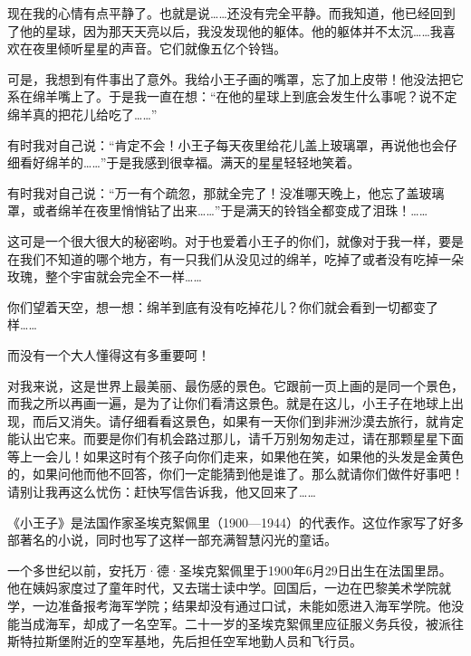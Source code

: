 现在我的心情有点平静了。也就是说\ldots{}\ldots{}还没有完全平静。而我知道，他已经回到了他的星球，因为那天天亮以后，我没发现他的躯体。他的躯体并不太沉\ldots{}\ldots{}我喜欢在夜里倾听星星的声音。它们就像五亿个铃铛。

可是，我想到有件事出了意外。我给小王子画的嘴罩，忘了加上皮带！他没法把它系在绵羊嘴上了。于是我一直在想：“在他的星球上到底会发生什么事呢？说不定绵羊真的把花儿给吃了\ldots{}\ldots{}”

有时我对自己说：“肯定不会！小王子每天夜里给花儿盖上玻璃罩，再说他也会仔细看好绵羊的\ldots{}\ldots{}”于是我感到很幸福。满天的星星轻轻地笑着。

有时我对自己说：“万一有个疏忽，那就全完了！没准哪天晚上，他忘了盖玻璃罩，或者绵羊在夜里悄悄钻了出来\ldots{}\ldots{}”于是满天的铃铛全都变成了泪珠！\ldots{}\ldots{}

这可是一个很大很大的秘密哟。对于也爱着小王子的你们，就像对于我一样，要是在我们不知道的哪个地方，有一只我们从没见过的绵羊，吃掉了或者没有吃掉一朵玫瑰，整个宇宙就会完全不一样\ldots{}\ldots{}

你们望着天空，想一想：绵羊到底有没有吃掉花儿？你们就会看到一切都变了样\ldots{}\ldots{}

而没有一个大人懂得这有多重要呵！

{\startalignment[center]
 \stopalignment}

对我来说，这是世界上最美丽、最伤感的景色。它跟前一页上画的是同一个景色，而我之所以再画一遍，是为了让你们看清这景色。就是在这儿，小王子在地球上出现，而后又消失。请仔细看看这景色，如果有一天你们到非洲沙漠去旅行，就肯定能认出它来。而要是你们有机会路过那儿，请千万别匆匆走过，请在那颗星星下面等上一会儿！如果这时有个孩子向你们走来，如果他在笑，如果他的头发是金黄色的，如果问他而他不回答，你们一定能猜到他是谁了。那么就请你们做件好事吧！请别让我再这么忧伤：赶快写信告诉我，他又回来了\ldots{}\ldots{}


\stoptitle

\starttitle[title={Le Petit Prince
附录},reference={part0030.html_a031}]

\startsubject[title={初版译序},reference={part0030.html_b001}]

《小王子》是法国作家圣埃克絮佩里（1900---1944）的代表作。这位作家写了好多部著名的小说，同时也写了这样一部充满智慧闪光的童话。

一个多世纪以前，安托万·德·圣埃克絮佩里于1900年6月29日出生在法国里昂。他在姨妈家度过了童年时代，又去瑞士读中学。回国后，一边在巴黎美术学院就学，一边准备报考海军学院；结果却没有通过口试，未能如愿进入海军学院。他没能当成海军，却成了一名空军。二十一岁的圣埃克絮佩里应征服义务兵役，被派往斯特拉斯堡附近的空军基地，先后担任空军地勤人员和飞行员。

